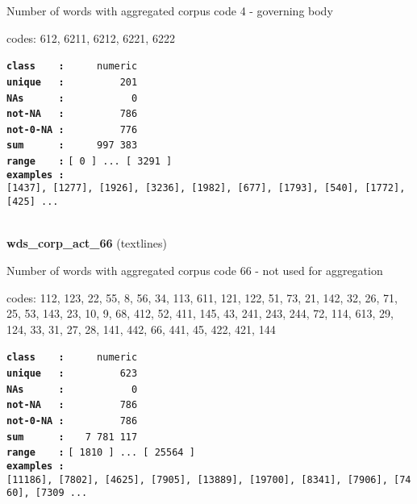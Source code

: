 \documentclass[]{article}
\begin{document}
Number of words with aggregated corpus code 4 - governing body

codes: 612, 6211, 6212, 6221, 6222

\textbf{\texttt{class\ \ \ \ :}} \texttt{~~~~~numeric}\\
\textbf{\texttt{unique\ \ \ :}} \texttt{~~~~~~~~~201}\\
\textbf{\texttt{NAs\ \ \ \ \ \ :}} \texttt{~~~~~~~~~~~0}\\
\textbf{\texttt{not-NA\ \ \ :}} \texttt{~~~~~~~~~786}\\
\textbf{\texttt{not-0-NA\ :}} \texttt{~~~~~~~~~776}\\
\textbf{\texttt{sum\ \ \ \ \ \ :}} \texttt{~~~~~997~383}\\
\textbf{\texttt{range\ \ \ \ :}}
\texttt{{[}\ 0\ {]}\ ...\ {[}\ 3291\ {]}}\\
\textbf{\texttt{examples\ :}}
\texttt{{[}1437{]},\ {[}1277{]},\ {[}1926{]},\ {[}3236{]},\ {[}1982{]},\ {[}677{]},\ {[}1793{]},\ {[}540{]},\ {[}1772{]},\ {[}425{]}\ ...}\\

~

\textbf{wds\_corp\_act\_66} (textlines)

Number of words with aggregated corpus code 66 - not used for
aggregation

codes: 112, 123, 22, 55, 8, 56, 34, 113, 611, 121, 122, 51, 73, 21, 142,
32, 26, 71, 25, 53, 143, 23, 10, 9, 68, 412, 52, 411, 145, 43, 241, 243,
244, 72, 114, 613, 29, 124, 33, 31, 27, 28, 141, 442, 66, 441, 45, 422,
421, 144

\textbf{\texttt{class\ \ \ \ :}} \texttt{~~~~~numeric}\\
\textbf{\texttt{unique\ \ \ :}} \texttt{~~~~~~~~~623}\\
\textbf{\texttt{NAs\ \ \ \ \ \ :}} \texttt{~~~~~~~~~~~0}\\
\textbf{\texttt{not-NA\ \ \ :}} \texttt{~~~~~~~~~786}\\
\textbf{\texttt{not-0-NA\ :}} \texttt{~~~~~~~~~786}\\
\textbf{\texttt{sum\ \ \ \ \ \ :}} \texttt{~~~7~781~117}\\
\textbf{\texttt{range\ \ \ \ :}}
\texttt{{[}\ 1810\ {]}\ ...\ {[}\ 25564\ {]}}\\
\textbf{\texttt{examples\ :}}
\texttt{{[}11186{]},\ {[}7802{]},\ {[}4625{]},\ {[}7905{]},\ {[}13889{]},\ {[}19700{]},\ {[}8341{]},\ {[}7906{]},\ {[}7460{]},\ {[}7309\ ...}\\

~
\end{document}
